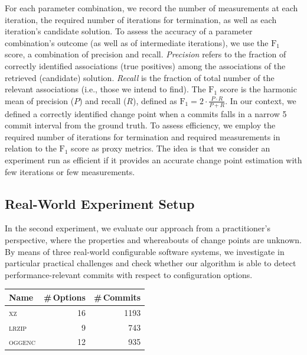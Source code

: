 \documentclass[sigconf, screen]{acmart}
\begin{document}
	For each parameter combination, we record the number of measurements at each iteration, the required number of iterations for termination, as well as each iteration's candidate solution. To assess the accuracy of a parameter combination's outcome (as well as of intermediate iterations), we use the $\text{F}_1$ score, a combination of precision and recall. \emph{Precision} refers to the fraction of correctly identified associations (true positives) among the associations of the retrieved (candidate) solution. \emph{Recall} is the fraction of total number of the relevant associations (i.e., those we intend to find). The $\text{F}_1$ score is the harmonic mean of precision ($P$) and recall ($R$), defined as $\text{F}_1 = 2\cdot\frac{P \cdot R}{P + R}$.	In our context, we defined a correctly identified change point when a commits falls in a narrow 5 commit interval from the ground truth.
	To assess efficiency, we employ the required number of iterations for termination and required measurements in relation to the $\text{F}_1$ score as proxy metrics. The idea is that we consider an experiment run as efficient if it provides an accurate change point estimation with few iterations or few measurements.
	
	\subsection{Real-World Experiment Setup}
	In the second experiment, we evaluate our approach from a practitioner's perspective, where the properties and whereabouts of change points are unknown.  By means of three real-world configurable software systems, we investigate in particular practical challenges and check whether our algorithm is able to detect performance-relevant commits with respect to configuration options. 
	
	\begin{table}
		\centering
		\label{tab:properties}
		\begin{tabular}{lrr}
			\toprule
			\textbf{Name} & \textbf{\#\,Options} & \textbf{\#\,Commits}\\
			\midrule
			\textsc{xz} & 16 & 1193\\
			\textsc{lrzip} & 9 & 743 \\
			\textsc{oggenc} & 12 & 935\\
			\bottomrule
		\end{tabular}
	\end{table}
	
\end{document}
